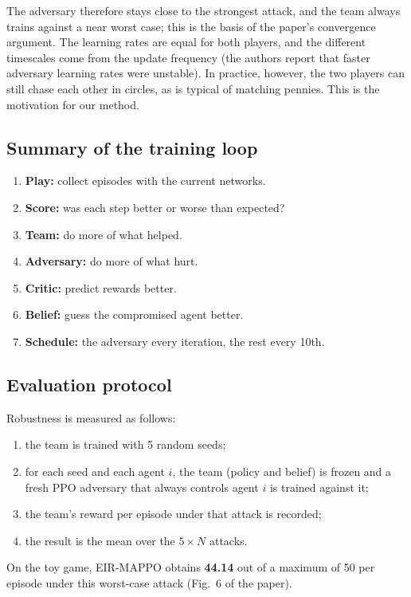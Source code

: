 \documentclass[11pt]{article}
\begin{document}
The adversary therefore stays close to the strongest attack, and the team always trains
against a near worst case; this is the basis of the paper's convergence argument. The
learning rates are equal for both players, and the different timescales come from the
update frequency (the authors report that faster adversary learning rates were unstable).
In practice, however, the two players can still chase each other in circles, as is typical
of matching pennies. This is the motivation for our method.

\subsection{Summary of the training loop}
\begin{enumerate}[nosep]
  \item \textbf{Play:} collect episodes with the current networks.
  \item \textbf{Score:} was each step better or worse than expected?
  \item \textbf{Team:} do more of what helped.
  \item \textbf{Adversary:} do more of what hurt.
  \item \textbf{Critic:} predict rewards better.
  \item \textbf{Belief:} guess the compromised agent better.
  \item \textbf{Schedule:} the adversary every iteration, the rest every 10th.
\end{enumerate}

\subsection{Evaluation protocol}
Robustness is measured as follows:
\begin{enumerate}[nosep]
  \item the team is trained with 5 random seeds;
  \item for each seed and each agent $i$, the team (policy and belief) is frozen and a fresh
        PPO adversary that always controls agent $i$ is trained against it;
  \item the team's reward per episode under that attack is recorded;
  \item the result is the mean over the $5 \times N$ attacks.
\end{enumerate}
On the toy game, EIR-MAPPO obtains \textbf{44.14} out of a maximum of 50 per episode under
this worst-case attack (Fig.~6 of the paper).
\end{document}
